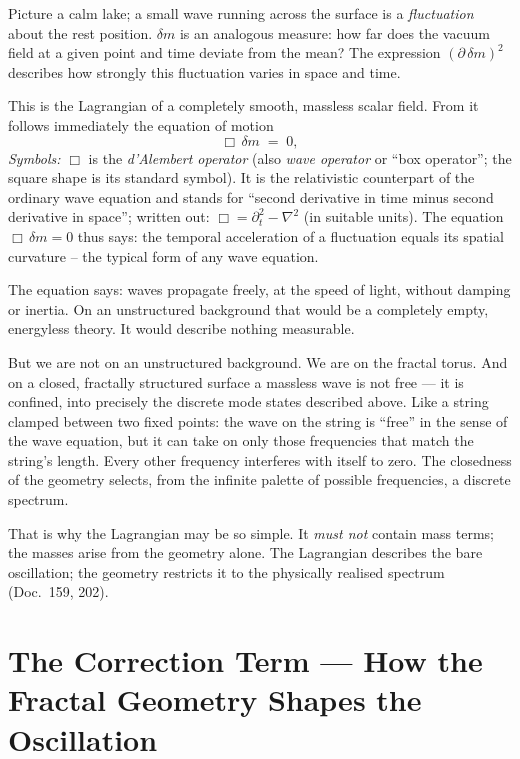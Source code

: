 \medskip\noindent
Picture a calm lake; a small wave running across the surface is a
\emph{fluctuation} about the rest position. $\delta m$ is an
analogous measure: how far does the vacuum field at a given point
and time deviate from the mean? The expression $(\partial\,\delta m)^2$
describes how strongly this fluctuation varies in space and time.

This is the Lagrangian of a completely smooth, massless scalar
field. From it follows immediately the equation of motion
\[
  \Box\,\delta m \;=\; 0,
\]
\noindent\textit{Symbols:}
$\Box$ is the \emph{d'Alembert operator} (also \emph{wave operator}
or \enquote{box operator}; the square shape is its standard symbol).
It is the relativistic counterpart of the ordinary wave equation
and stands for \enquote{second derivative in time minus second
derivative in space}; written out: $\Box = \partial_t^2 - \nabla^2$
(in suitable units). The equation $\Box\,\delta m = 0$ thus says: the
temporal acceleration of a fluctuation equals its spatial curvature
-- the typical form of any wave equation.

\medskip\noindent
The equation says: waves propagate freely, at the speed of light,
without damping or inertia. On an unstructured background that would be a completely
empty, energyless theory. It would describe nothing measurable.

But we are not on an unstructured background. We are on the fractal
torus. And on a closed, fractally structured surface a massless wave
is not free --- it is confined, into precisely the discrete mode
states described above. Like a string clamped between two fixed
points: the wave on the string is \enquote{free} in the sense of the
wave equation, but it can take on only those frequencies that match
the string's length. Every other frequency interferes with itself
to zero. The closedness of the geometry selects, from the infinite
palette of possible frequencies, a discrete spectrum.

That is why the Lagrangian may be so simple. It \emph{must not}
contain mass terms; the masses arise from the geometry alone. The
Lagrangian describes the bare oscillation; the geometry restricts
it to the physically realised spectrum (Doc.~159, 202).

\section{The Correction Term --- How the Fractal Geometry Shapes the Oscillation}

